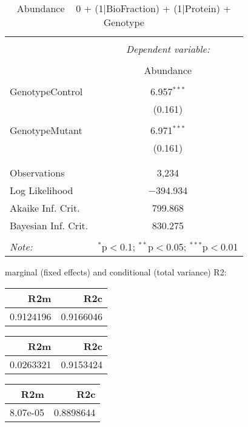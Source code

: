 \documentclass[11pt]{report}
\begin{document}
\begin{table}[!htbp] \centering 
  \caption{Abundance ~ 0 + (1|BioFraction) + (1|Protein) + Genotype} 
  \label{} 
\begin{tabular}{@{\extracolsep{5pt}}lc} 
\\[-1.8ex]\hline 
\hline \\[-1.8ex] 
 & \multicolumn{1}{c}{\textit{Dependent variable:}} \\ 
\cline{2-2} 
\\[-1.8ex] & Abundance \\ 
\hline \\[-1.8ex] 
 GenotypeControl & 6.957$^{***}$ \\ 
  & (0.161) \\ 
  & \\ 
 GenotypeMutant & 6.971$^{***}$ \\ 
  & (0.161) \\ 
  & \\ 
\hline \\[-1.8ex] 
Observations & 3,234 \\ 
Log Likelihood & $-$394.934 \\ 
Akaike Inf. Crit. & 799.868 \\ 
Bayesian Inf. Crit. & 830.275 \\ 
\hline 
\hline \\[-1.8ex] 
\textit{Note:}  & \multicolumn{1}{r}{$^{*}$p$<$0.1; $^{**}$p$<$0.05; $^{***}$p$<$0.01} \\ 
\end{tabular} 
\end{table} 
marginal (fixed effects) and conditional (total variance) R2:

\begin{tabular}{r|r}
\hline
R2m & R2c\\
\hline
0.9124196 & 0.9166046\\
\hline
\end{tabular}

\begin{tabular}{r|r}
\hline
R2m & R2c\\
\hline
0.0263321 & 0.9153424\\
\hline
\end{tabular}

\begin{tabular}{r|r}
\hline
R2m & R2c\\
\hline
8.07e-05 & 0.8898644\\
\hline
\end{tabular}
\end{document}
